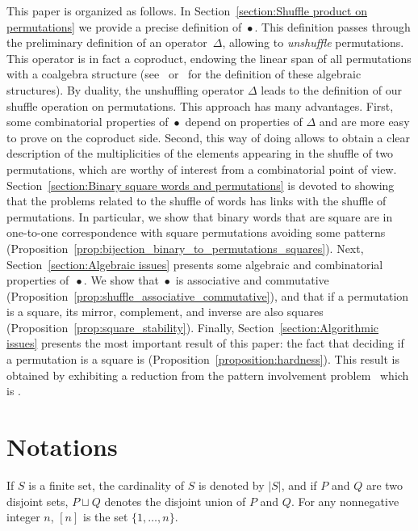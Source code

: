 \documentclass[a4paper]{llncs}
\DeclareMathOperator{\SHUFFLE}{\bullet}
\begin{document}
This paper is organized as follows. In
Section~\ref{section:Shuffle product on permutations} we provide a
precise definition of $\SHUFFLE$. This definition passes through the
preliminary definition of an operator~$\Delta$, allowing to
{\em unshuffle} permutations. This operator is in fact a coproduct,
endowing the linear span of all permutations with a coalgebra structure
(see~\cite{Joni:Rota:1979} or~\cite{Grinberg:Reiner:2014} for the
definition of these algebraic structures). By duality, the unshuffling
operator $\Delta$ leads to the definition of our shuffle operation on
permutations. This approach has many advantages. First, some
combinatorial properties of $\SHUFFLE$ depend on properties of $\Delta$
and are more easy to prove on the coproduct side. Second, this way of
doing allows to obtain a clear description of the multiplicities of the
elements appearing in the shuffle of two permutations, which are worthy
of interest from a combinatorial point of view.
Section~\ref{section:Binary square words and permutations} is devoted to
showing that the problems related to the shuffle of words has links with
the shuffle of permutations. In particular, we show that binary words
that are square are in one-to-one correspondence with square
permutations avoiding some patterns
(Proposition~\ref{prop:bijection_binary_to_permutations_squares}). Next,
Section~\ref{section:Algebraic issues} presents some algebraic and
combinatorial properties of~$\SHUFFLE$. We show that $\SHUFFLE$ is
associative and commutative
(Proposition~\ref{prop:shuffle_associative_commutative}), and that if a
permutation is a square, its mirror, complement, and inverse are also
squares (Proposition~\ref{prop:square_stability}). Finally,
Section~\ref{section:Algorithmic issues} presents the most important result
of this paper: the fact that deciding if a permutation is a square is
\NPC (Proposition~\ref{proposition:hardness}). This result is obtained
by exhibiting a reduction from the pattern involvement
problem~\cite{Bose:Buss:Lubiw:1998} which is \NPC. 


\section{Notations}
\label{section:Notations}

If $S$ is a finite set, the cardinality of $S$ is denoted by $|S|$,
and if $P$ and $Q$ are two disjoint sets, $P \sqcup Q$ denotes the
disjoint union of $P$ and $Q$. For any nonnegative integer $n$, $[n]$
is the set $\{1, \dots, n\}$.
\end{document}
